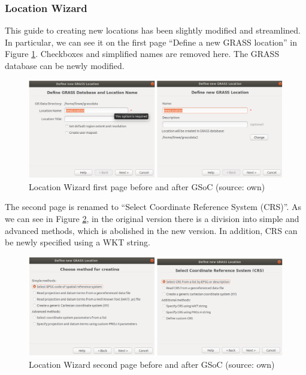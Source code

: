\documentclass[a4paper,10pt,twoside]{article}
\begin{document}
\newpage
\vspace*{-1cm}
\subsubsection{Location Wizard}

This guide to creating new locations has been slightly modified and streamlined. In particular, we can see it on the first page ``Define a new GRASS location'' in Figure \ref{fig:loc_wiz_1}. Checkboxes and simplified names are removed here. The GRASS database can be newly modified.

\vspace{0.3cm}
\begin{figure}[hbt!] 
\begin{center}
\includegraphics[width=15cm]{../pictures/loc_wiz_1.png} 
\caption[Location Wizard first page before and after GSoC]{Location Wizard first page before and after GSoC (source: own)}
\label{fig:loc_wiz_1}
\end{center}
\end{figure}

\noindent The second page is renamed to ``Select Coordinate Reference System (CRS)''. As we can see in Figure \ref{fig:loc_wiz_2}, in the original version there is a division into simple and advanced methods, which is abolished in the new version. In addition, CRS can be newly specified using a WKT string.

\vspace{0.3cm}
\begin{figure}[hbt!] 
\begin{center}
\includegraphics[width=15cm]{../pictures/loc_wiz_2.png} 
\caption[Location Wizard second page before and after GSoC]{Location Wizard second page before and after GSoC (source: own)}
\label{fig:loc_wiz_2}
\end{center}
\end{figure}
\end{document}
